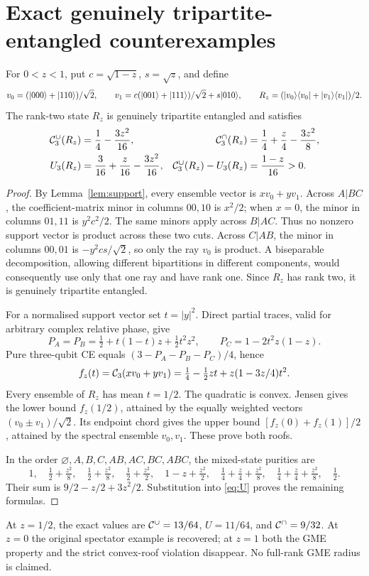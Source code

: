 \section{Exact genuinely tripartite-entangled counterexamples}
\begin{theorem}\label{thm:gme}
For $0<z<1$, put $c=\sqrt{1-z}$, $s=\sqrt z$, and define
\[
v_0=(\lvert 000\rangle+\lvert 110\rangle)/\sqrt2,\qquad
v_1=c(\lvert 001\rangle+\lvert 111\rangle)/\sqrt2+s\lvert 010\rangle,\qquad
R_z=(\lvert v_0\rangle\langle v_0\rvert+\lvert v_1\rangle\langle v_1\rvert)/2.
\]
The rank-two state $R_z$ is genuinely tripartite entangled and satisfies
\begin{align}
\mathcal C_3^\cup(R_z)&=\frac14-\frac{3z^2}{16},&
\mathcal C_3^\cap(R_z)&=\frac14+\frac z4-\frac{3z^2}{8},\\
U_3(R_z)&=\frac3{16}+\frac z{16}-\frac{3z^2}{16},&
\mathcal C_3^\cup(R_z)-U_3(R_z)&=\frac{1-z}{16}>0.
\end{align}
\end{theorem}
\begin{proof}
By Lemma~\ref{lem:support}, every ensemble vector is $xv_0+yv_1$. Across $A|BC$, the coefficient-matrix minor in columns $00,10$ is $x^2/2$; when $x=0$, the minor in columns $01,11$ is $y^2c^2/2$. The same minors apply across $B|AC$. Thus no nonzero support vector is product across these two cuts. Across $C|AB$, the minor in columns $00,01$ is $-y^2cs/\sqrt2$, so only the ray $v_0$ is product. A biseparable decomposition, allowing different bipartitions in different components, would consequently use only that one ray and have rank one. Since $R_z$ has rank two, it is genuinely tripartite entangled.

For a normalised support vector set $t=|y|^2$. Direct partial traces, valid for arbitrary complex relative phase, give
\[
P_A=P_B=\tfrac12+t(1-t)z+\tfrac12t^2z^2,\qquad
P_C=1-2t^2z(1-z).
\]
Pure three-qubit CE equals $(3-P_A-P_B-P_C)/4$, hence
\[
f_z(t)=\mathcal C_3(xv_0+yv_1)=\tfrac14-\tfrac12zt+z(1-3z/4)t^2.
\]
Every ensemble of $R_z$ has mean $t=1/2$. The quadratic is convex. Jensen gives the lower bound $f_z(1/2)$, attained by the equally weighted vectors $(v_0\pm v_1)/\sqrt2$. Its endpoint chord gives the upper bound $[f_z(0)+f_z(1)]/2$, attained by the spectral ensemble $v_0,v_1$. These prove both roofs.

In the order $\varnothing,A,B,C,AB,AC,BC,ABC$, the mixed-state purities are
\[
1,\quad\tfrac12+\tfrac{z^2}8,\quad\tfrac12+\tfrac{z^2}8,\quad
\tfrac12+\tfrac{z^2}2,\quad1-z+\tfrac{z^2}2,\quad
\tfrac14+\tfrac z4+\tfrac{z^2}8,\quad
\tfrac14+\tfrac z4+\tfrac{z^2}8,\quad\tfrac12.
\]
Their sum is $9/2-z/2+3z^2/2$. Substitution into \eqref{eq:U} proves the remaining formulas.
\end{proof}
At $z=1/2$, the exact values are $\mathcal C^\cup=13/64$, $U=11/64$, and $\mathcal C^\cap=9/32$. At $z=0$ the original spectator example is recovered; at $z=1$ both the GME property and the strict convex-roof violation disappear. No full-rank GME radius is claimed.

